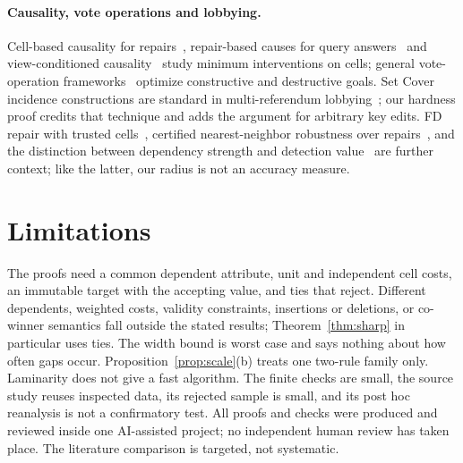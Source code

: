\documentclass[11pt]{article}
\theoremstyle{remark}
\begin{document}
\paragraph{Causality, vote operations and lobbying.}
Cell-based causality for repairs~\cite{cellcauses}, repair-based causes for
query answers~\cite{bertossi} and view-conditioned causality~\cite{vcc} study
minimum interventions on cells; general vote-operation frameworks~\cite{xia}
optimize constructive and destructive goals. Set Cover incidence constructions
are standard in multi-referendum lobbying~\cite{lobbying}; our hardness proof
credits that technique and adds the argument for arbitrary key edits. FD repair
with trusted cells~\cite{repairs}, certified nearest-neighbor robustness over
repairs~\cite{knn}, and the distinction between dependency strength and
detection value~\cite{wan} are further context; like the latter, our radius is
not an accuracy measure.

\section{Limitations}
The proofs need a common dependent attribute, unit and independent cell costs,
an immutable target with the accepting value, and ties that reject. Different
dependents, weighted costs, validity constraints, insertions or deletions, or
co-winner semantics fall outside the stated results; Theorem~\ref{thm:sharp}
in particular uses ties. The width bound is worst case and says nothing about
how often gaps occur. Proposition~\ref{prop:scale}(b) treats one two-rule
family only. Laminarity does not give a fast algorithm. The finite
checks are small, the source study reuses inspected data, its rejected sample is
small, and its post hoc reanalysis is not a confirmatory test. All proofs and
checks were produced and reviewed inside one AI-assisted project; no
independent human review has taken place. The literature comparison is
targeted, not systematic.
\end{document}
